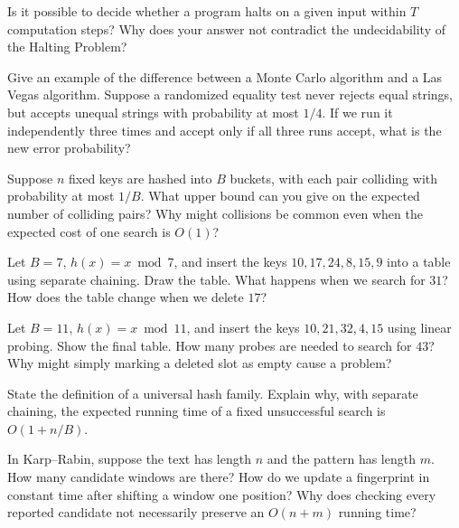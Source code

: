 \documentclass[11 pt]{exam}
\begin{document}
\begin{questions}
		\question Is it possible to decide whether a program halts on a given input within $T$ computation steps? Why does your answer not contradict the undecidability of the Halting Problem?

		\question Give an example of the difference between a Monte Carlo algorithm and a Las Vegas algorithm. Suppose a randomized equality test never rejects equal strings, but accepts unequal strings with probability at most $1/4$. If we run it independently three times and accept only if all three runs accept, what is the new error probability?

		\question Suppose $n$ fixed keys are hashed into $B$ buckets, with each pair colliding with probability at most $1/B$. What upper bound can you give on the expected number of colliding pairs? Why might collisions be common even when the expected cost of one search is $O(1)$?

		\question Let $B=7$, $h(x)=x\bmod 7$, and insert the keys $10,17,24,8,15,9$ into a table using separate chaining. Draw the table. What happens when we search for $31$? How does the table change when we delete $17$?

		\question Let $B=11$, $h(x)=x\bmod 11$, and insert the keys $10,21,32,4,15$ using linear probing. Show the final table. How many probes are needed to search for $43$? Why might simply marking a deleted slot as empty cause a problem?

		\question State the definition of a universal hash family. Explain why, with separate chaining, the expected running time of a fixed unsuccessful search is $O(1+n/B)$.

		\question In Karp--Rabin, suppose the text has length $n$ and the pattern has length $m$. How many candidate windows are there? How do we update a fingerprint in constant time after shifting a window one position? Why does checking every reported candidate not necessarily preserve an $O(n+m)$ running time?
	\end{questions}
\end{document}

